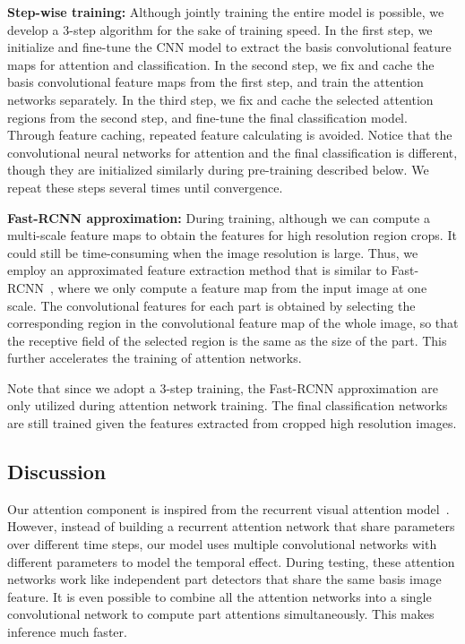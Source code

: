 \documentclass[10pt,twocolumn,letterpaper]{article}
\begin{document}
\textbf{Step-wise training:} Although jointly training the entire model is possible, we develop a 3-step algorithm for the sake of training speed.
In the first step, we initialize and fine-tune the CNN model to extract the basis convolutional feature maps for attention and classification.
In the second step, we fix and cache the basis convolutional feature maps from the first step, and train the attention networks separately.
In the third step, we fix and cache the selected attention regions from the second step, and fine-tune the final classification model.
Through feature caching, repeated feature calculating is avoided.
Notice that the convolutional neural networks for attention and the final classification is different, though they are initialized similarly during pre-training described below.
We repeat these steps several times until convergence.

\textbf{Fast-RCNN approximation:} During training, although we can compute a multi-scale feature maps to obtain the features for high resolution region crops. It could still be time-consuming when the image resolution is large.
Thus, we employ an approximated feature extraction method that is similar to Fast-RCNN~\cite{girshick2015fast}, where we only compute a feature map from the input image at one scale.
The convolutional features for each part is obtained by selecting the corresponding region in the convolutional feature map of the whole image, so that the receptive field of the selected region is the same as the size of the part.
This further accelerates the training of attention networks.

Note that since we adopt a 3-step training, the Fast-RCNN approximation are only utilized during attention network training.
The final classification networks are still trained given the features extracted from cropped high resolution images.

\subsection{Discussion}

Our attention component is inspired from the recurrent visual attention model~\cite{mnih2014recurrent}.
However, instead of building a recurrent attention network that share parameters over different time steps, our model uses multiple convolutional networks with different parameters to model the temporal effect.
During testing, these attention networks work like independent part detectors that share the same basis image feature.
It is even possible to combine all the attention networks into a single convolutional network to compute part attentions simultaneously.
This makes inference much faster.
\end{document}
